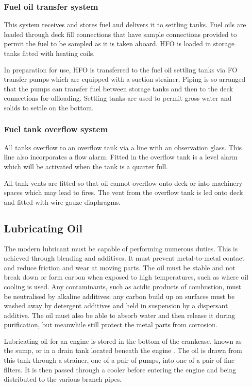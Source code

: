\documentclass[11pt,a4paper]{article}
\begin{document}
\subsubsection{Fuel oil transfer system}

This system receives and stores fuel and delivers it to settling tanks. Fuel oils are loaded through deck fill connections that have sample connections provided to permit the fuel to be sampled as it is taken aboard. HFO is loaded in storage tanks fitted with heating coils.

In preparation for use, HFO is transferred to the fuel oil settling tanks via FO transfer pumps which are equipped with a suction strainer. Piping is so arranged that the pumps can transfer fuel between storage tanks and then to the deck connections for offloading. Settling tanks are used to permit gross water and solids to settle on the bottom.

\subsubsection{Fuel tank overflow system}
All tanks overflow to an overflow tank via a line with an observation glass. This line also incorporates a flow alarm. Fitted in the overflow tank is a level alarm which will be activated when the tank is a quarter full.

All tank vents are fitted so that oil cannot overflow onto deck or into machinery spaces which may lead to fires. The vent from the overflow tank is led onto deck and fitted with wire gauze diaphragms.\cite{m1}\cite{m2}
\subsection{Lubricating Oil}
The modern lubricant must be capable of performing numerous duties. This is achieved through blending and additives. It must prevent metal-to-metal contact and reduce friction and wear at moving parts. The oil must be stable and not break down or form carbon when exposed to high temperatures, such as where oil cooling is used. Any contaminants, such as acidic products of combustion, must be neutralised by alkaline additives; any carbon build up on surfaces must be washed away by detergent additives and held in suspension by a dispersant additive. The oil must also be able to absorb water and then release it during purification, but meanwhile still protect the metal parts from corrosion.

Lubricating oil for an engine is stored in the bottom of the crankcase, known as the sump, or in a drain tank located beneath the engine . The oil is drawn from this tank through a strainer, one of a pair of pumps, into one of a pair of fine filters. It is then passed through a cooler before entering the engine and being distributed to the various branch pipes. \cite{m2}
\end{document}
